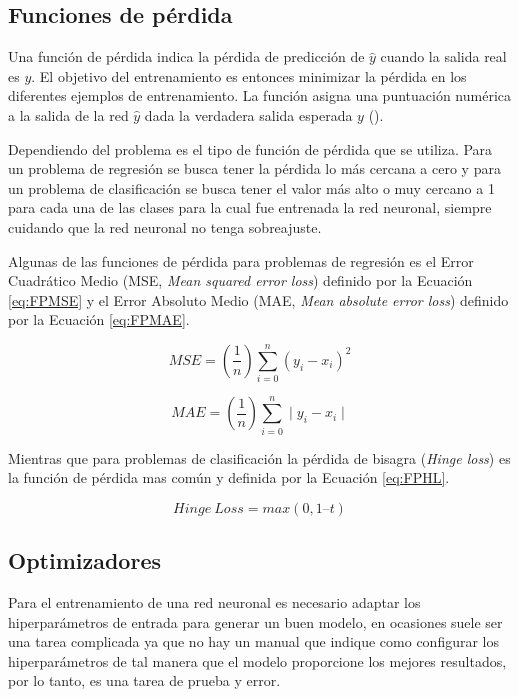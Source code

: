 \subsection{Funciones de pérdida}

Una función de pérdida indica la pérdida de predicción de $\hat{y}$ cuando la salida real es $y$. El objetivo del entrenamiento es entonces minimizar la pérdida en los diferentes ejemplos de entrenamiento. La función asigna una puntuación numérica a la salida de la red $\hat{y}$ dada la verdadera salida esperada $y$ (\cite{goldberg2017Neural}).

Dependiendo del problema es el tipo de función de pérdida que se utiliza. Para un problema de regresión se busca tener la pérdida lo más cercana a cero y para un problema de clasificación se busca tener el valor más alto o muy cercano a 1 para cada una de las clases para la cual fue entrenada la red neuronal, siempre cuidando que la red neuronal no tenga sobreajuste.


Algunas de las funciones de pérdida para problemas de  regresión es el Error Cuadrático Medio (MSE, \textit{Mean squared error loss}) definido por la Ecuación \ref{eq:FPMSE} y el Error Absoluto Medio (MAE, \textit{Mean absolute error loss}) definido por la Ecuación \ref{eq:FPMAE}.

\begin{equation}
    \label{eq:FPMSE}
    MSE = (\frac{1}{n}) \displaystyle\sum\limits_{i=0}^n (y_i - x_i)^{2}
\end{equation}

\begin{equation}
    \label{eq:FPMAE}
    MAE = (\frac{1}{n}) \displaystyle\sum\limits_{i=0}^n \mid y_i - x_i \mid
\end{equation}

Mientras que para problemas de clasificación la pérdida de bisagra (\textit{Hinge loss}) es la función de pérdida mas común y definida por la Ecuación \ref{eq:FPHL}.

\begin{equation}
    \label{eq:FPHL}
    Hinge\: Loss = max(0, 1 – t)
\end{equation}


\subsection{Optimizadores}

Para el entrenamiento de una red neuronal es necesario adaptar los hiperparámetros de entrada para generar un buen modelo, en ocasiones suele ser una tarea complicada ya que no hay un manual que indique como configurar los hiperparámetros de tal manera que el modelo proporcione los mejores resultados, por lo tanto, es una tarea de prueba y error.

